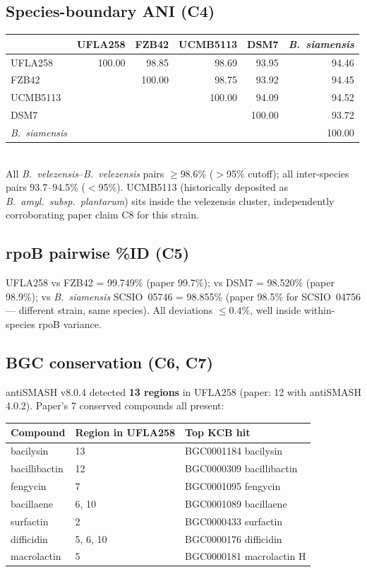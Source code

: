 \documentclass[11pt]{article}
\begin{document}
\subsection*{Species-boundary ANI (C4)}
\begin{tabularx}{\textwidth}{@{}Xrrrrr@{}}
\toprule
& UFLA258 & FZB42 & UCMB5113 & DSM7 & \textit{B.\ siamensis} \\
\midrule
UFLA258 & 100.00 & 98.85 & 98.69 & 93.95 & 94.46 \\
FZB42 & & 100.00 & 98.75 & 93.92 & 94.45 \\
UCMB5113 & & & 100.00 & 94.09 & 94.52 \\
DSM7 & & & & 100.00 & 93.72 \\
\textit{B.\ siamensis} & & & & & 100.00 \\
\bottomrule
\end{tabularx}\\
All \textit{B.\ velezensis}--\textit{B.\ velezensis} pairs $\ge 98.6\%$ ($>$95\% cutoff); all inter-species pairs 93.7--94.5\% ($<$95\%). UCMB5113 (historically deposited as \textit{B.\ amyl.\ subsp.\ plantarum}) sits inside the velezensis cluster, independently corroborating paper claim C8 for this strain.

\subsection*{rpoB pairwise \%ID (C5)}
UFLA258 vs FZB42 = 99.749\% (paper 99.7\%); vs DSM7 = 98.520\% (paper 98.9\%); vs \textit{B.\ siamensis} SCSIO~05746 = 98.855\% (paper 98.5\% for SCSIO~04756 --- different strain, same species). All deviations $\leq 0.4\%$, well inside within-species rpoB variance.

\subsection*{BGC conservation (C6, C7)}
antiSMASH v8.0.4 detected \textbf{13 regions} in UFLA258 (paper: 12 with antiSMASH 4.0.2). Paper's 7 conserved compounds all present:

\begin{tabularx}{\textwidth}{@{}Xll@{}}
\toprule
Compound & Region in UFLA258 & Top KCB hit \\
\midrule
bacilysin & 13 & BGC0001184 bacilysin \\
bacillibactin & 12 & BGC0000309 bacillibactin \\
fengycin & 7 & BGC0001095 fengycin \\
bacillaene & 6, 10 & BGC0001089 bacillaene \\
surfactin & 2 & BGC0000433 surfactin \\
difficidin & 5, 6, 10 & BGC0000176 difficidin \\
macrolactin & 5 & BGC0000181 macrolactin H \\
\bottomrule
\end{tabularx}
\end{document}

